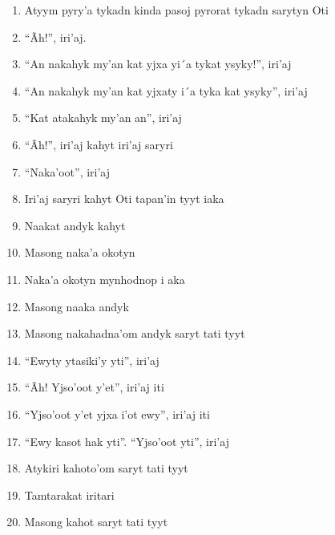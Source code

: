 \begin{enumerate}
 \item Atyym pyry'a tykadn kinda pasoj pyrorat tykadn sarytyn Oti

 \begin{center}\end{center}

 \item ``Ãh!'', iri'aj.

 \item ``An nakahyk my'an kat yjxa yi´a tykat ysyky!'', iri'aj

 \item ``An nakahyk my'an kat yjxaty i´a tyka kat ysyky'', iri'aj

 \item ``Kat atakahyk my'an an'', iri'aj

 \item ``Ãh!'', iri'aj kahyt iri'aj saryri

 \item ``Naka'oot'', iri'aj

 \item Iri'aj saryri kahyt Oti tapan'in tyyt iaka

 \item Naakat andyk kahyt

 \item Masong naka'a okotyn

 \item Naka'a okotyn mynhodnop i aka

 \item Masong naaka andyk

 \item Masong nakahadna'om andyk saryt tati tyyt

 \item ``Ewyty ytasiki'y yti'', iri'aj

 \item ``Ãh! Yjso'oot y'et'', iri'aj iti

 \item ``Yjso'oot y'et yjxa i'ot ewy'', iri'aj iti

 \item ``Ewy kasot hak yti''.  ``Yjso'oot yti'', iri'aj

 \item Atykiri kahoto'om saryt tati tyyt

 \item Tamtarakat iritari

 \item Masong kahot saryt tati tyyt


\end{enumerate}
